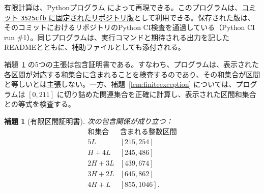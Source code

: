 \documentclass[12pt]{ltjsarticle}
\theoremstyle{plain}
\newtheorem{lemma}[theorem]{補題}
\theoremstyle{definition}
\theoremstyle{plain}
\begin{document}
有限計算は、Pythonプログラム  によって再現できる。このプログラムは、\href{https://github.com/growupkuriyama-hub/lean_cfg_project/blob/3525cfb/LeanCfgProject/PrimDyck/verify_certificates_for_paper.py}{コミット \texttt{3525cfb} に固定されたリポジトリ版}として利用できる。保存された版は、そのコミットにおけるリポジトリのPython CI検査を通過している（Python CI run \#1）。同じプログラムは、実行コマンドと期待される出力を記したREADMEとともに、補助ファイルとしても添付される。

補題~\ref{lem:finitefive} の5つの主張は包含証明書である。すなわち、プログラムは、表示された各区間が対応する和集合に含まれることを検査するのであり、その和集合が区間と等しいとは主張しない。一方、補題~\ref{lem:finiteexception} については、プログラムは $[0,211]$ に切り詰めた関連集合を正確に計算し、表示された区間和集合との等式を検査する。

\begin{lemma}[有限区間証明書]\label{lem:finitefive}
次の包含関係が成り立つ：
\begin{equation}\label{eq:finite-interval-certificate}
\begin{array}{c|c}
\text{和集合}&\text{含まれる整数区間}\\ \hline
5L &[215,254]\\
H+4L &[245,486]\\
2H+3L &[439,674]\\
3H+2L &[645,862]\\
4H+L &[855,1046].
\end{array}
\end{equation}
\end{lemma}
\end{document}
